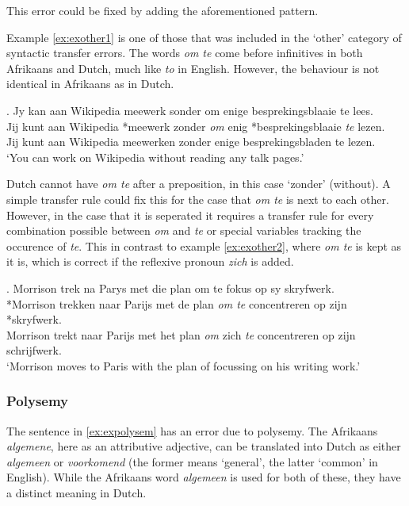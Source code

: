 \documentclass[11pt]{article}
\begin{document}
This error could be fixed by adding the aforementioned pattern.

Example \ref{ex:exother1} is one of those that was included in the `other' category of syntactic
transfer errors. The words \emph{om te} come before infinitives in both Afrikaans and Dutch, much like
\emph{to} in English. However, the behaviour is not identical in Afrikaans as in Dutch.

\ex. \label{ex:exother1}
    Jy kan aan Wikipedia meewerk sonder om enige besprekingsblaaie te lees. \\
    Jij kunt aan Wikipedia *meewerk zonder {\em om} enig *besprekingsblaaie {\em te} lezen. \\
    Jij kunt aan Wikipedia meewerken zonder enige besprekingsbladen te lezen. \\
    `You can work on Wikipedia without reading any talk pages.'

Dutch cannot have \emph{om te} after a preposition, in this case `zonder' (without). A simple transfer rule could fix this
for the case that \emph{om te} is next to each other. However, in the case that it is seperated it requires
a transfer rule for every combination possible between \emph{om} and \emph{te} or special variables tracking the
occurence of \emph{te}.
This in contrast to example \ref{ex:exother2}, where \emph{om te} is kept as it is, which is correct
if the reflexive pronoun \emph{zich} is added. 

\ex. \label{ex:exother2}
    Morrison trek na Parys met die plan om te fokus op sy skryfwerk. \\
    *Morrison trekken naar Parijs met de plan {\em om te} concentreren op zijn *skryfwerk. \\
    Morrison trekt naar Parijs met het plan {\em om} zich {\em te} concentreren op zijn schrijfwerk. \\
    `Morrison moves to Paris with the plan of focussing on his writing work.'

\subsubsection{Polysemy}

The sentence in \ref{ex:expolysem} has an error due to polysemy. The Afrikaans {\em algemene}, here as
an attributive adjective, can be translated into Dutch as either {\em algemeen} or {\em voorkomend} 
(the former means `general', the latter `common' in English). While the Afrikaans word {\em algemeen} is used
for both of these, they have a distinct meaning in Dutch.
\end{document}

